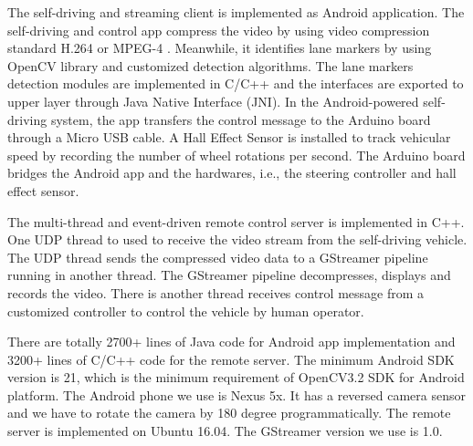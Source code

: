 The self-driving and streaming client is implemented as
Android application. 
The self-driving and control app compress the video by using 
video compression standard H.264 or MPEG-4 \cite{marpe2006h}.  
Meanwhile, it identifies lane markers by using OpenCV
library and customized detection algorithms. 
The lane markers detection modules are implemented
in C/C++ and the interfaces are exported to upper 
layer through Java Native Interface (JNI).  
In the Android-powered self-driving system, 
the app transfers the control message to the
Arduino board through a Micro USB cable. 
A Hall Effect Sensor is installed to track vehicular speed
by recording the number of wheel rotations per second. 
The Arduino board bridges the Android app and the hardwares, 
i.e., the steering controller and hall effect sensor. 


The multi-thread and event-driven remote control 
server is implemented in C++.  
One UDP thread to used to receive the video stream from the
self-driving vehicle. 
The UDP thread sends the compressed video data to a GStreamer
pipeline \cite{gstreamer} running in another thread. 
The GStreamer pipeline decompresses, displays and records the video.   
There is another thread receives control message from a customized
controller to control the vehicle by human operator.


There are totally 2700+ lines of Java code for Android app implementation
and 3200+ lines of C/C++ code for the remote server.
The minimum Android SDK version is 21, which is the minimum requirement
of OpenCV3.2 SDK for Android platform. 
The Android phone we use is Nexus 5x. 
It has a reversed camera sensor and we have to rotate the camera by 180 degree
programmatically. 
The remote server is implemented on Ubuntu 16.04. 
The GStreamer version we use is 1.0. 

